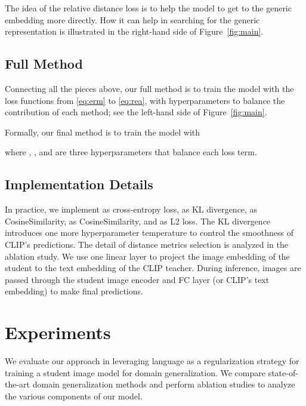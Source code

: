\documentclass[10pt,twocolumn,letterpaper]{article}
\begin{document}
The idea of the relative distance loss is to help the model to get to the generic embedding more directly. 
How it can help in searching for the generic representation is illustrated in the right-hand side of Figure~\ref{fig:main}. 






\subsection{Full Method}

Connecting all the pieces above, our full method is to 
train the model with the loss functions from 
\eqref{eq:erm} to \eqref{eq:rea}, 
with hyperparameters to balance the contribution of each method; see the left-hand side of Figure~\ref{fig:main}.  

Formally, our final method is to train the model 
with 

where , , and 
are three hyperparameters that balance each loss term. 

\subsection{Implementation Details}

In practice, we implement  as cross-entropy loss, 
 as KL divergence,  as CosineSimilarity,  as CosineSimilarity, and  as L2 loss. The KL divergence  introduces one more hyperparameter temperature  to control the smoothness of CLIP's predictions. The detail of distance metrics selection is analyzed in the ablation study.
We use one linear layer to project the image embedding of the student to the text embedding of the CLIP teacher. During inference, images are passed through the student image encoder and FC layer (or CLIP's text embedding) to make final predictions.

















 \section{Experiments}
\label{sec:exp}
We evaluate our approach in leveraging language as a regularization strategy for training a student image model for domain generalization.  We compare state-of-the-art domain generalization methods and perform ablation studies to analyze the various components of our model.  
\end{document}
